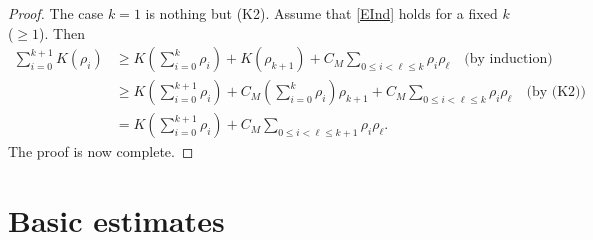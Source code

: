 \documentclass[12pt, reqno]{amsart}
\numberwithin{equation}{section}
\begin{document}
%
\begin{proof}
The case $k=1$ is nothing but (K2).
 Assume that \eqref{EInd} holds for a fixed $k$ ($\ge1$).
 Then
\begin{align*}
    \sum_{i=0}^{k+1} K(\rho_i)
    &\ge K\left(\sum_{i=0}^k \rho_i \right) + K(\rho_{k+1})
    + C_M \sum_{0\le i<\ell \le k} \rho_i \rho_\ell
    \quad\text{(by induction)} \\
    &\ge K\left(\sum_{i=0}^{k+1} \rho_i\right)
    + C_M \left(\sum_{i=0}^k \rho_i\right) \rho_{k+1}
    + C_M \sum_{0\le i<\ell\le k} \rho_i \rho_\ell
    \quad\text{(by (K2))} \\
    &= K\left(\sum_{i=0}^{k+1} \rho_i \right)
    + C_M \sum_{0\le i<\ell\le k+1} \rho_i \rho_\ell.
\end{align*}
The proof is now complete.
\end{proof}
%
\section{Basic estimates} \label{SB} %
\end{document}

